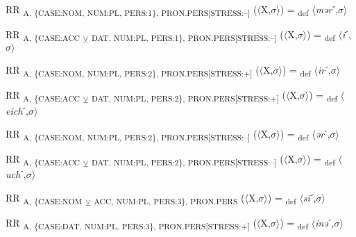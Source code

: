 {\begin{exe}
 RR \textsubscript{A, \{CASE:NOM, NUM:PL, PERS:1\}, PRON.PERS[STRESS:–]} ($\langle$X,$\sigma $$\rangle$) = \textsubscript{def} $\langle$\textit{mər}ˊ,$\sigma $$\rangle$
\end{exe}

\begin{exe}
 RR \textsubscript{A, \{CASE:ACC} \textsubscript{${\veebar}$}\textsubscript{ DAT, NUM:PL, PERS:1\}, PRON.PERS[STRESS:–]} ($\langle$X,$\sigma $$\rangle$) = \textsubscript{def} $\langle$\textit{i}ˊ,$\sigma $$\rangle$
\end{exe}

\begin{exe}
 RR \textsubscript{A, \{CASE:NOM, NUM:PL, PERS:2\}, PRON.PERS[STRESS:+]} ($\langle$X,$\sigma $$\rangle$) = \textsubscript{def} $\langle$\textit{ir}ˊ,$\sigma $$\rangle$
\end{exe}

\begin{exe}
 RR \textsubscript{A, \{CASE:ACC} \textsubscript{${\veebar}$}\textsubscript{ DAT, NUM:PL, PERS:2\}, PRON.PERS[STRESS:+]} ($\langle$X,$\sigma $$\rangle$) = \textsubscript{def} $\langle$\textit{eich}ˊ,$\sigma $$\rangle$
\end{exe}

\begin{exe}
 RR \textsubscript{A, \{CASE:NOM, NUM:PL, PERS:2\}, PRON.PERS[STRESS:–]} ($\langle$X,$\sigma $$\rangle$) = \textsubscript{def} $\langle$\textit{ər}ˊ,$\sigma $$\rangle$
\end{exe}

\begin{exe}
 RR \textsubscript{A, \{CASE:ACC} \textsubscript{${\veebar}$}\textsubscript{ DAT, NUM:PL, PERS:2\}, PRON.PERS[STRESS:–]} ($\langle$X,$\sigma $$\rangle$) = \textsubscript{def} $\langle$\textit{uch}ˊ,$\sigma $$\rangle$
\end{exe}

\begin{exe}
 RR \textsubscript{A, \{CASE:NOM} \textsubscript{${\veebar}$}\textsubscript{ ACC, NUM:PL, PERS:3\}, PRON.PERS} ($\langle$X,$\sigma $$\rangle$) = \textsubscript{def} $\langle$\textit{si}ˊ,$\sigma $$\rangle$
\end{exe}

\begin{exe}
 RR \textsubscript{A, \{CASE:DAT, NUM:PL, PERS:3\}, PRON.PERS[STRESS:+]} ($\langle$X,$\sigma $$\rangle$) = \textsubscript{def} $\langle$\textit{inə}ˊ,$\sigma $$\rangle$
\end{exe}

}
